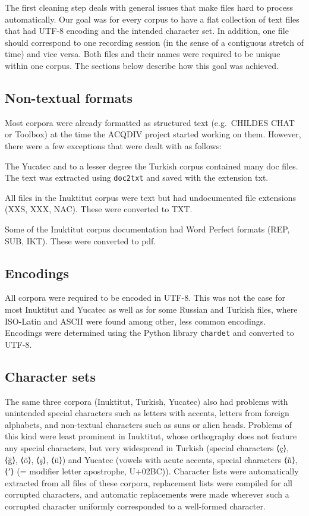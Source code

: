 \documentclass[a4paper, 11pt]{book}
\begin{document}
The first cleaning step deals with general issues that make files hard to process automatically. Our goal was for every corpus to have a flat collection of text files that had UTF-8 encoding and the intended character set. In addition, one file should correspond to one recording session (in the sense of a contiguous stretch of time) and vice versa. Both files and their names were required to be unique within one corpus. The sections below describe how this goal was achieved. 

\subsection{Non-textual formats}
Most corpora were already formatted as structured text (e.g.\ CHILDES CHAT or Toolbox) at the time the ACQDIV project started working on them. However, there were a few exceptions that were dealt with as follows: 

\begin{itemize*}
	\item The Yucatec and to a lesser degree the Turkish corpus contained many doc files. The text was extracted using \texttt{doc2txt} and saved with the extension txt. 
	\item All files in the Inuktitut corpus were text but had undocumented file extensions (XXS, XXX, NAC). These were converted to TXT. 
	\item Some of the Inuktitut corpus documentation had Word Perfect formats (REP, SUB, IKT). These were converted to pdf. 
\end{itemize*}

\subsection{Encodings}

All corpora were required to be encoded in UTF-8. This was not the case for most Inuktitut and Yucatec as well as for some Russian and Turkish files, where ISO-Latin and ASCII were found among other, less common encodings. Encodings were determined using the Python library \texttt{chardet} and converted to UTF-8.  

\subsection{Character sets}

The same three corpora (Inuktitut, Turkish, Yucatec) also had problems with unintended special characters such as letters with accents, letters from foreign alphabets, and non-textual characters such as suns or alien heads. Problems of this kind were least prominent in Inuktitut, whose orthography does not feature any special characters, but very widespread in Turkish (special characters ⟨ç⟩, ⟨ğ⟩, ⟨ö⟩, ⟨ş⟩, ⟨ü⟩) and Yucatec (vowels with acute accents, special characters ⟨ñ⟩, ⟨ʼ⟩ (= modifier letter apostrophe, U+02BC)). Character lists were automatically extracted from all files of these corpora, replacement lists were compiled for all corrupted characters, and automatic replacements were made wherever such a corrupted character uniformly corresponded to a well-formed character. 
\end{document}
